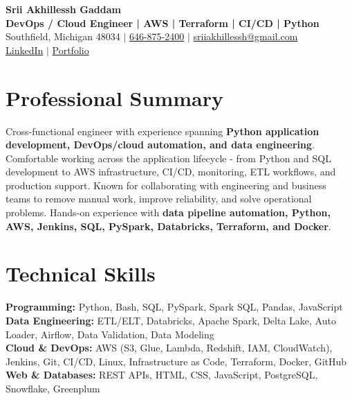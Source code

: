 \documentclass[letterpaper,10pt]{article}
\begin{document}
\fontsize{9.35pt}{10.45pt}\selectfont

\begin{center}
    {\LARGE \textbf{Srii Akhillessh Gaddam}} \\[-1pt]
    \textbf{DevOps / Cloud Engineer | AWS | Terraform | CI/CD | Python} \\[2pt]
    Southfield, Michigan 48034 $|$
    \href{tel:6468752400}{646-875-2400} $|$
    \href{mailto:sriiakhillessh@gmail.com}{sriiakhillessh@gmail.com} \\[1pt]
    \href{https://www.linkedin.com/in/srii-akhiilessh-gaddam-b48668191/}{LinkedIn} $|$
    \href{https://sriiakhillesshg.github.io/portfolio/}{Portfolio}
\end{center}
\vspace{-8pt}

\section{Professional Summary}
\small{Cross-functional engineer with experience spanning \textbf{Python application development, DevOps/cloud automation, and data engineering}. Comfortable working across the application lifecycle - from Python and SQL development to AWS infrastructure, CI/CD, monitoring, ETL workflows, and production support. Known for collaborating with engineering and business teams to remove manual work, improve reliability, and solve operational problems. Hands-on experience with \textbf{data pipeline automation, Python, AWS, Jenkins, SQL, PySpark, Databricks, Terraform, and Docker}.}

\section{Technical Skills}
\small{
\textbf{Programming:} Python, Bash, SQL, PySpark, Spark SQL, Pandas, JavaScript \\
\textbf{Data Engineering:} ETL/ELT, Databricks, Apache Spark, Delta Lake, Auto Loader, Airflow, Data Validation, Data Modeling \\
\textbf{Cloud \& DevOps:} AWS (S3, Glue, Lambda, Redshift, IAM, CloudWatch), Jenkins, Git, CI/CD, Linux, Infrastructure as Code, Terraform, Docker, GitHub \\
\textbf{Web \& Databases:} REST APIs, HTML, CSS, JavaScript, PostgreSQL, Snowflake, Greenplum
}
\end{document}
